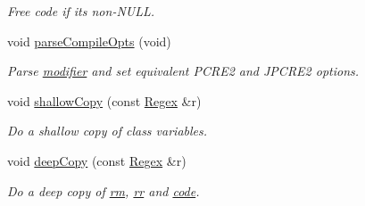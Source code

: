 \begin{DoxyCompactItemize}
\begin{DoxyCompactList}\small\item\em Free code if it\textquotesingle{}s non-\/\+N\+U\+LL. \end{DoxyCompactList}\item 
void \hyperlink{classjpcre2_1_1Regex_a0430f0a7643258cba9dc1c29ad3bc31e}{parse\+Compile\+Opts} (void)
\begin{DoxyCompactList}\small\item\em Parse \hyperlink{classjpcre2_1_1Regex_ab4447726c0cedd7868a600ea7db876a8}{modifier} and set equivalent P\+C\+R\+E2 and J\+P\+C\+R\+E2 options. \end{DoxyCompactList}\item 
void \hyperlink{classjpcre2_1_1Regex_a24594d3bdb08b3795080c68019928f3a}{shallow\+Copy} (const \hyperlink{classjpcre2_1_1Regex}{Regex} \&r)\hypertarget{classjpcre2_1_1Regex_a24594d3bdb08b3795080c68019928f3a}{}\label{classjpcre2_1_1Regex_a24594d3bdb08b3795080c68019928f3a}

\begin{DoxyCompactList}\small\item\em Do a shallow copy of class variables. \end{DoxyCompactList}\item 
void \hyperlink{classjpcre2_1_1Regex_acaa5da5fc3ad903e3ecc724750214e07}{deep\+Copy} (const \hyperlink{classjpcre2_1_1Regex}{Regex} \&r)\hypertarget{classjpcre2_1_1Regex_acaa5da5fc3ad903e3ecc724750214e07}{}\label{classjpcre2_1_1Regex_acaa5da5fc3ad903e3ecc724750214e07}

\begin{DoxyCompactList}\small\item\em Do a deep copy of \hyperlink{classjpcre2_1_1Regex_a447925705d222dbbd8c7d60b98cc65f0}{rm}, \hyperlink{classjpcre2_1_1Regex_a5a7ac6c6288988079b8933b4b6637fab}{rr} and \hyperlink{classjpcre2_1_1Regex_a2742264206d8976c413b474b7bac4b2e}{code}. \end{DoxyCompactList}\end{DoxyCompactItemize}
